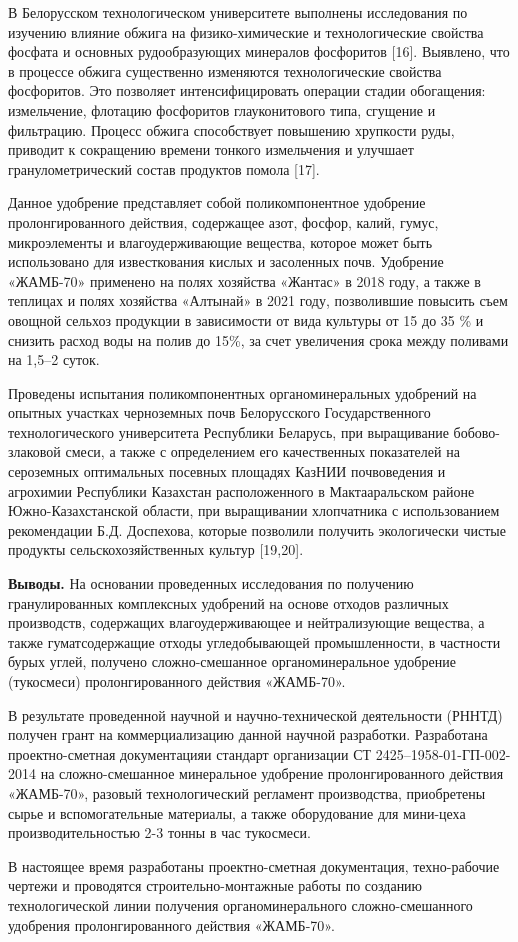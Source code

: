 \begin{multicols}{2}
В Белорусском технологическом университете выполнены исследования по
изучению влияние обжига на физико-химические и технологические свойства
фосфата и основных рудообразующих минералов фосфоритов {[}16{]}.
Выявлено, что в процессе обжига существенно изменяются технологические
свойства фосфоритов. Это позволяет интенсифицировать операции стадии
обогащения: измельчение, флотацию фосфоритов глауконитового типа,
сгущение и фильтрацию. Процесс обжига способствует повышению хрупкости
руды, приводит к сокращению времени тонкого измельчения и улучшает
гранулометрический состав продуктов помола {[}17{]}.

Данное удобрение представляет собой поликомпонентное удобрение
пролонгированного действия, содержащее азот, фосфор, калий, гумус,
микроэлементы и влагоудерживающие вещества, которое может быть
использовано для известкования кислых и засоленных почв. Удобрение
«ЖАМБ-70» применено на полях хозяйства «Жантас» в 2018 году, а также в
теплицах и полях хозяйства «Алтынай» в 2021 году, позволившие повысить
съем овощной сельхоз продукции в зависимости от вида культуры от 15 до
35 \% и снизить расход воды на полив до 15\%, за счет увеличения срока
между поливами на 1,5--2 суток.

Проведены испытания поликомпонентных органоминеральных удобрений на
опытных участках черноземных почв Белорусского Государственного
технологического университета Республики Беларусь, при выращивание
бобово-злаковой смеси, а также с определением его качественных
показателей на сероземных оптимальных посевных площадях КазНИИ
почвоведения и агрохимии Республики Казахстан расположенного в
Мактааральском районе Южно-Казахстанской области, при выращивании
хлопчатника с использованием рекомендации Б.Д. Доспехова, которые
позволили получить экологически чистые продукты сельскохозяйственных
культур {[}19,20{]}.

{\bfseries Выводы.} На основании проведенных исследования по получению
гранулированных комплексных удобрений на основе отходов различных
производств, содержащих влагоудерживающее и нейтрализующие вещества, а
также гуматсодержащие отходы угледобывающей промышленности, в частности
бурых углей, получено сложно-смешанное органоминеральное удобрение
(тукосмеси) пролонгированного действия «ЖАМБ-70».

В результате проведенной научной и научно-технической деятельности
(РННТД) получен грант на коммерциализацию данной научной разработки.
Разработана проектно-сметная документацияи стандарт организации СТ
2425--1958-01-ГП-002-2014 на сложно-смешанное минеральное удобрение
пролонгированного действия «ЖАМБ-70», разовый технологический регламент
производства, приобретены сырье и вспомогательные материалы, а также
оборудование для мини-цеха производительностью 2-3 тонны в час
тукосмеси.

В настоящее время разработаны проектно-сметная документация,
техно-рабочие чертежи и проводятся строительно-монтажные работы по
созданию технологической линии получения органоминерального
сложно-смешанного удобрения пролонгированного действия «ЖАМБ-70».
\end{multicols}


